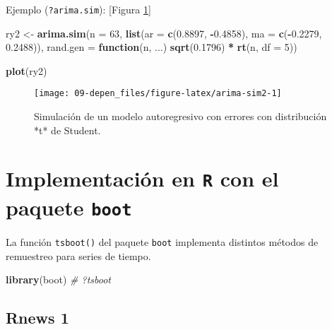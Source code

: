 \documentclass[]{book}
\newenvironment{Shaded}{\begin{snugshade}}{\end{snugshade}}
\newcommand{\KeywordTok}[1]{\textcolor[rgb]{0.13,0.29,0.53}{\textbf{#1}}}
\newcommand{\DataTypeTok}[1]{\textcolor[rgb]{0.13,0.29,0.53}{#1}}
\newcommand{\DecValTok}[1]{\textcolor[rgb]{0.00,0.00,0.81}{#1}}
\newcommand{\FloatTok}[1]{\textcolor[rgb]{0.00,0.00,0.81}{#1}}
\newcommand{\StringTok}[1]{\textcolor[rgb]{0.31,0.60,0.02}{#1}}
\newcommand{\CommentTok}[1]{\textcolor[rgb]{0.56,0.35,0.01}{\textit{#1}}}
\newcommand{\ControlFlowTok}[1]{\textcolor[rgb]{0.13,0.29,0.53}{\textbf{#1}}}
\newcommand{\OperatorTok}[1]{\textcolor[rgb]{0.81,0.36,0.00}{\textbf{#1}}}
\newcommand{\NormalTok}[1]{#1}
\theoremstyle{break}
\theoremstyle{definition}
\theoremstyle{definition}
\theoremstyle{definition}
\theoremstyle{remark}
\begin{document}
Ejemplo (\texttt{?arima.sim}): {[}Figura \ref{fig:arima-sim2}{]}

\begin{Shaded}
\begin{Highlighting}[]
\NormalTok{ry2 <-}\StringTok{ }\KeywordTok{arima.sim}\NormalTok{(}\DataTypeTok{n =} \DecValTok{63}\NormalTok{, }\KeywordTok{list}\NormalTok{(}\DataTypeTok{ar =} \KeywordTok{c}\NormalTok{(}\FloatTok{0.8897}\NormalTok{, }\OperatorTok{-}\FloatTok{0.4858}\NormalTok{), }
          \DataTypeTok{ma =} \KeywordTok{c}\NormalTok{(}\OperatorTok{-}\FloatTok{0.2279}\NormalTok{, }\FloatTok{0.2488}\NormalTok{)),}
          \DataTypeTok{rand.gen =} \ControlFlowTok{function}\NormalTok{(n, ...) }\KeywordTok{sqrt}\NormalTok{(}\FloatTok{0.1796}\NormalTok{) }\OperatorTok{*}\StringTok{ }\KeywordTok{rt}\NormalTok{(n, }\DataTypeTok{df =} \DecValTok{5}\NormalTok{))}

\KeywordTok{plot}\NormalTok{(ry2)}
\end{Highlighting}
\end{Shaded}

\begin{figure}[!htb]

{\centering \texttt{[image: 09-depen\_files/figure-latex/arima-sim2-1]} 

}

\caption{Simulación de un modelo autoregresivo con errores con distribución *t* de Student.}\label{fig:arima-sim2}
\end{figure}

\section{\texorpdfstring{Implementación en \texttt{R} con el paquete
\texttt{boot}}{Implementación en R con el paquete boot}}\label{implementaciuxf3n-en-r-con-el-paquete-boot}

La función \texttt{tsboot()} del paquete \texttt{boot} implementa
distintos métodos de remuestreo para series de tiempo.

\begin{Shaded}
\begin{Highlighting}[]
\KeywordTok{library}\NormalTok{(boot)}
\CommentTok{# ?tsboot}
\end{Highlighting}
\end{Shaded}

\subsection{Rnews 1}\label{rnews-1}
\end{document}
